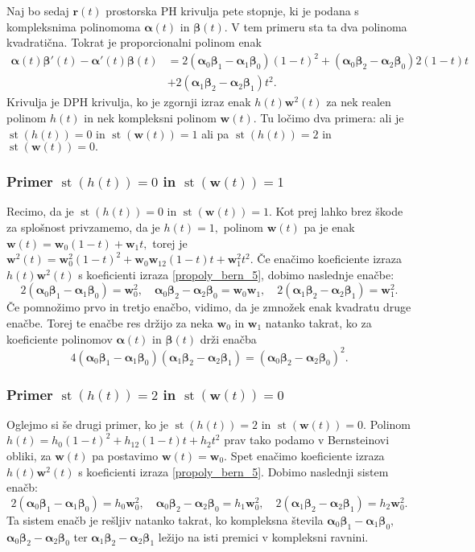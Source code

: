 \documentclass[12pt,a4paper,twoside]{article}
\theoremstyle{definition} %
\theoremstyle{plain} %
\numberwithin{equation}{section}  %
\newcommand{\rV}{\mathbf{r}}
\newcommand{\wV}{\mathbf{w}}
\newcommand{\balpha}{\boldsymbol \alpha}
\newcommand{\bbeta}{\boldsymbol \beta}
\DeclareMathOperator{\st}{st}
\begin{document}
Naj bo sedaj $\rV(t)$ prostorska PH krivulja pete stopnje, ki je podana s kompleksnima polinomoma $\balpha(t)$ in $\bbeta(t).$ V tem primeru sta ta dva polinoma kvadratična. Tokrat je proporcionalni polinom enak
\begin{align}
	\balpha(t)\bbeta'(t)-\balpha'(t)\bbeta(t)&=2(\balpha_0\bbeta_1-\balpha_1\bbeta_0)(1-t)^2+(\balpha_0\bbeta_2-\balpha_2\bbeta_0)2(1-t)t\nonumber\\
	&+2(\balpha_1\bbeta_2-\balpha_2\bbeta_1)t^2.\label{propoly_bern_5}
\end{align}
Krivulja je DPH krivulja, ko je zgornji izraz enak $h(t)\wV^2(t)$ za nek realen polinom $h(t)$ in nek kompleksni polinom $\wV(t).$ Tu ločimo dva primera: ali je $\st(h(t))=0$ in $\st(\wV(t))=1$ ali pa $\st(h(t))=2$ in $\st(\wV(t))=0.$

\subsubsection*{Primer $\st(h(t))=0$ in $\st(\wV(t))=1$}

Recimo, da je $\st(h(t))=0$ in $\st(\wV(t))=1.$ Kot prej lahko brez škode za splošnost privzamemo, da je $h(t)=1,$ polinom $\wV(t)$ pa je enak $\wV(t)=\wV_0(1-t)+\wV_1t,$ torej je $\wV^2(t)=\wV_0^2(1-t)^2+\wV_0\wV_12(1-t)t+\wV_1^2t^2.$ Če enačimo koeficiente izraza $h(t)\wV^2(t)$ s koeficienti izraza \eqref{propoly_bern_5}, dobimo naslednje enačbe:
\begin{equation}
	2(\balpha_0\bbeta_1-\balpha_1\bbeta_0)=\wV_0^2,\quad \balpha_0\bbeta_2-\balpha_2\bbeta_0=\wV_0\wV_1,\quad 2(\balpha_1\bbeta_2-\balpha_2\bbeta_1)=\wV_1^2.
\end{equation}
Če pomnožimo prvo in tretjo enačbo, vidimo, da je zmnožek enak kvadratu druge enačbe. Torej te enačbe res držijo za neka $\wV_0$ in $\wV_1$ natanko takrat, ko za koeficiente polinomov $\balpha(t)$ in $\bbeta(t)$ drži enačba
\begin{equation}
	\label{st5h0w1}
	4(\balpha_0\bbeta_1-\balpha_1\bbeta_0)(\balpha_1\bbeta_2-\balpha_2\bbeta_1)=(\balpha_0\bbeta_2-\balpha_2\bbeta_0)^2.
\end{equation}
\subsubsection*{Primer $\st(h(t))=2$ in $\st(\wV(t))=0$}
Oglejmo si še drugi primer, ko je $\st(h(t))=2$ in $\st(\wV(t))=0.$ Polinom $h(t)=h_0(1-t)^2+h_12(1-t)t+h_2t^2$ prav tako podamo v Bernsteinovi obliki, za $\wV(t)$ pa postavimo $\wV(t)=\wV_0.$ Spet enačimo koeficiente izraza $h(t)\wV^2(t)$ s koeficienti izraza \eqref{propoly_bern_5}. Dobimo naslednji sistem enačb:
\begin{equation}
	2(\balpha_0\bbeta_1-\balpha_1\bbeta_0)=h_0\wV_0^2,\quad \balpha_0\bbeta_2-\balpha_2\bbeta_0=h_1\wV_0^2,\quad 2(\balpha_1\bbeta_2-\balpha_2\bbeta_1)=h_2\wV_0^2.\label{st5h2w0}
\end{equation}
Ta sistem enačb je rešljiv natanko takrat, ko kompleksna števila $\balpha_0\bbeta_1-\balpha_1\bbeta_0,$ $\balpha_0\bbeta_2-\balpha_2\bbeta_0$ ter $\balpha_1\bbeta_2-\balpha_2\bbeta_1$ ležijo na isti premici v kompleksni ravnini.
\end{document}
